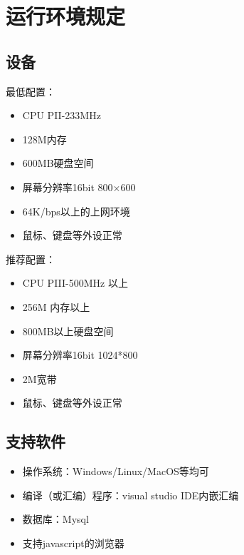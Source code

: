 \documentclass[a4paper,14pt]{ctexart}
\begin{document}

\section{运行环境规定}
\subsection{设备}
最低配置：
\begin{itemize}
\item CPU PII-233MHz  
\item 128M内存  
\item 600MB硬盘空间   
\item 屏幕分辨率16bit 800×600  
\item 64K/bps以上的上网环境
\item 鼠标、键盘等外设正常
\end{itemize}
推荐配置：
\begin{itemize}
\item CPU PIII-500MHz 以上  
\item 256M 内存以上 
\item 800MB以上硬盘空间   
\item 屏幕分辨率16bit 1024*800
\item 2M宽带
\item 鼠标、键盘等外设正常
\end{itemize}

\subsection{支持软件}
\begin{itemize}
\item 操作系统：Windows/Linux/MacOS等均可
\item 编译（或汇编）程序：visual studio IDE内嵌汇编
\item 数据库：Mysql
\item 支持javascript的浏览器


\end{itemize}
\end{document}
